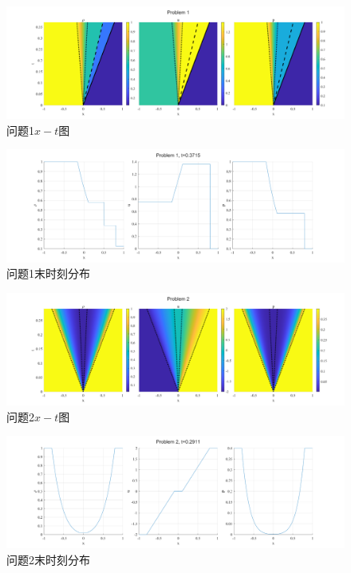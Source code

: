 \documentclass[UTF8,zihao=5]{ctexart} %
\begin{document}
\begin{figure}[H]
    \centering
    \includegraphics[width=18cm]{p1.png}  %
    \caption{问题1$x-t$图}
    \label{fig:1a}
\end{figure}

\begin{figure}[H]
    \centering
    \includegraphics[width=18cm]{p1_l.png}  %
    \caption{问题1末时刻分布}
    \label{fig:1b}
\end{figure}


\begin{figure}[H]
    \centering
    \includegraphics[width=18cm]{p2.png}  %
    \caption{问题2$x-t$图}
    \label{fig:2a}
\end{figure}

\begin{figure}[H]
    \centering
    \includegraphics[width=18cm]{p2_l.png}  %
    \caption{问题2末时刻分布}
    \label{fig:2b}
\end{figure}
\end{document}
